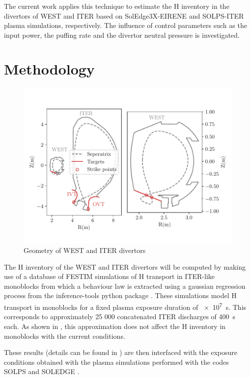 The current work applies this technique to estimate the H inventory in the divertors of WEST and ITER based on SolEdge3X-EIRENE \cite{bufferand_three-dimensional_2019} and SOLPS-ITER \cite{kaveeva_solps-iter_2020} plasma simulations, respectively.
The influence of control parameters such as the input power, the puffing rate and the divertor neutral pressure is investigated.


\section{Methodology}
\begin{figure}[h!]
    \centering
    \includegraphics[width=0.65\linewidth]{Figures/divertor/coordinates.pdf}
    \caption{Geometry of WEST and ITER divertors}
    \label{fig: reactors}
\end{figure}

The H inventory of the WEST and ITER divertors will be computed by making use of a database of FESTIM simulations of H transport in ITER-like monoblocks from which a behaviour law is extracted using a gaussian regression process from the inference-tools python package \cite{chris_bowman_c-bowmaninference-tools_2020}.
These simulations model H transport in monoblocks for a fixed plasma exposure duration of \SI{e7}{s}.
This corresponds to approximately 25 000 concatenated ITER discharges of \SI{400}{s} each.
As shown in \cite{hodille_modelling_2021}, this approximation does not affect the H inventory in monoblocks with the current conditions.

These results (details can be found in \cite{delaporte-mathurin_parametric_2020}) are then interfaced with the exposure conditions obtained with the plasma simulations performed with the codes SOLPS \cite{kaveeva_solps-iter_2020} and SOLEDGE \cite{bufferand_three-dimensional_2019}.


